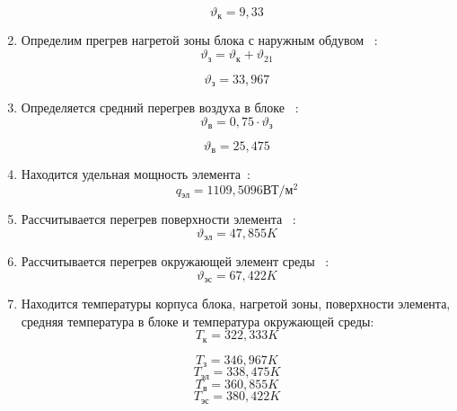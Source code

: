 \begin{enumerate}[label={\arabic*.}]
$$\vartheta\mathrm{_к} = 9,33$$

\item Определим прегрев нагретой зоны блока с наружным обдувом
  ~\cite{Rotkop1976}:
  \begin{equation}
    \vartheta\mathrm{_з} =  \vartheta\mathrm{_к} + \vartheta_{21}
    \end{equation}
  
$$\vartheta\mathrm{_з} = 33,967$$

\item Определяется средний перегрев воздуха в блоке ~\cite{Rotkop1976}:
  \begin{equation}
    \vartheta\mathrm{_в} = 0,75 \cdot \vartheta\mathrm{_з}
  \end{equation}

  $$\vartheta\mathrm{_в} = 25,475$$
  \item Находится удельная мощность элемента~\cite{Rotkop1976}:
    $$q\mathrm{_{эл}} =1109,5096\mathrm{ВТ/м^2} $$
    
\item Рассчитывается перегрев поверхности элемента ~\cite{Rotkop1976}:
  $$\vartheta\mathrm{_{эл}} =47,855K$$

\item Рассчитывается перегрев окружающей элемент среды ~\cite{Rotkop1976}:
  $$\vartheta\mathrm{_{эс}} = 67,422K$$

\item Находится температуры корпуса блока, нагретой зоны, поверхности
  элемента, средняя температура в блоке и температура окружающей среды:
  $$T\mathrm{_{к}} = 322,333 K$$
  
    $$T\mathrm{_з} = 346,967 K$$
    $$T\mathrm{_{эл}} = 338,475 K$$
    $$T\mathrm{_{в}} = 360,855 K$$
    $$T\mathrm{_{эс}} =380,422 K$$

\end{enumerate}
